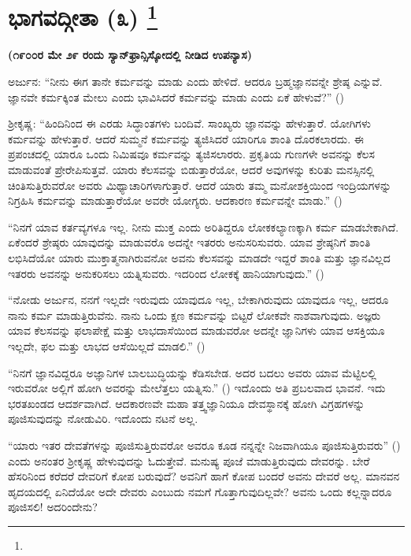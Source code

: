 
\chapter[ಭಾಗವದ್ಗೀತಾ (೩) ]{ಭಾಗವದ್ಗೀತಾ (೩) \protect\footnote{}}

\centerline{\textbf{(೧೯೦೦ರ ಮೇ ೨೯ ರಂದು ಸ್ಯಾನ್​ಫ್ರಾನ್ಸಿಸ್ಕೋದಲ್ಲಿ ನೀಡಿದ ಉಪನ್ಯಾಸ)}}

ಅರ್ಜುನ: “ನೀನು ಈಗ ತಾನೇ ಕರ್ಮವನ್ನು ಮಾಡು ಎಂದು ಹೇಳಿದೆ. ಆದರೂ ಬ್ರಹ್ಮಜ್ಞಾನವನ್ನೇ ಶ್ರೇಷ್ಠ ಎನ್ನುವೆ. ಜ್ಞಾನವೇ ಕರ್ಮಕ್ಕಿಂತ ಮೇಲು ಎಂದು ಭಾವಿಸಿದರೆ ಕರ್ಮವನ್ನು ಮಾಡು ಎಂದು ಏಕೆ ಹೇಳುವೆ?” ()

ಶ‍್ರೀಕೃಷ್ಣ: “ಹಿಂದಿನಿಂದ ಈ ಎರಡು ಸಿದ್ಧಾಂತಗಳು ಬಂದಿವೆ. ಸಾಂಖ್ಯರು ಜ್ಞಾನವನ್ನು ಹೇಳುತ್ತಾರೆ. ಯೋಗಿಗಳು ಕರ್ಮವನ್ನು ಹೇಳುತ್ತಾರೆ. ಆದರೆ ಸುಮ್ಮನೆ ಕರ್ಮವನ್ನು ತ್ಯಜಿಸಿದರೆ ಯಾರಿಗೂ ಶಾಂತಿ ದೊರಕಲಾರದು. ಈ ಪ್ರಪಂಚದಲ್ಲಿ ಯಾರೂ ಒಂದು ನಿಮಿಷವೂ ಕರ್ಮವನ್ನು ತ್ಯಜಿಸಲಾರರು. ಪ್ರಕೃತಿಯ ಗುಣಗಳೇ ಅವನನ್ನು ಕೆಲಸ ಮಾಡುವಂತೆ ಪ್ರೇರೇಪಿಸುತ್ತವೆ. ಯಾರು ಕೆಲಸವನ್ನು ಬಿಡುತ್ತಾರೆಯೋ, ಆದರೆ ಅವುಗಳನ್ನು ಕುರಿತು ಮನಸ್ಸಿನಲ್ಲಿ ಚಿಂತಿಸುತ್ತಿರುವರೋ ಅವರು ಮಿಥ್ಯಾಚಾರಿಗಳಾಗುತ್ತಾರೆ. ಆದರೆ ಯಾರು ತಮ್ಮ ಮನೋಶಕ್ತಿಯಿಂದ ಇಂದ್ರಿಯಗಳನ್ನು ನಿಗ್ರಹಿಸಿ ಕರ್ಮವನ್ನು ಮಾಡುತ್ತಾರೆಯೋ ಅವರೇ ಯೋಗ್ಯರು. ಆದಕಾರಣ ಕರ್ಮವನ್ನೇ ಮಾಡು.” ()

“ನಿನಗೆ ಯಾವ ಕರ್ತವ್ಯಗಳೂ ಇಲ್ಲ. ನೀನು ಮುಕ್ತ ಎಂದು ಅರಿತಿದ್ದರೂ ಲೋಕಕಲ್ಯಾಣಕ್ಕಾಗಿ ಕರ್ಮ ಮಾಡಬೇಕಾಗಿದೆ. ಏಕೆಂದರೆ ಶ್ರೇಷ್ಠರು ಯಾವುದನ್ನು ಮಾಡುವರೊ ಅದನ್ನೇ ಇತರರು ಅನುಸರಿಸುವರು. ಯಾವ ಶ್ರೇಷ್ಠನಿಗೆ ಶಾಂತಿ ಲಭಿಸಿದೆಯೋ ಯಾರು ಮುಕ್ತಾತ್ಮನಾಗಿರುವನೋ ಅವನು ಕೆಲಸವನ್ನು ಮಾಡದೇ ಇದ್ದರೆ ಶಾಂತಿ ಮತ್ತು ಜ್ಞಾನವಿಲ್ಲದ ಇತರರು ಅವನನ್ನು ಅನುಕರಿಸಲು ಯತ್ನಿಸುವರು. ಇದರಿಂದ ಲೋಕಕ್ಕೆ ಹಾನಿಯಾಗುವುದು.” ()

“ನೋಡು ಅರ್ಜುನ, ನನಗೆ ಇಲ್ಲದೇ ಇರುವುದು ಯಾವುದೂ ಇಲ್ಲ, ಬೇಕಾಗಿರುವುದು ಯಾವುದೂ ಇಲ್ಲ, ಆದರೂ ನಾನು ಕರ್ಮ ಮಾಡುತ್ತಿರುವೆನು. ನಾನು ಒಂದು ಕ್ಷಣ ಕರ್ಮವನ್ನು ಬಿಟ್ಟರೆ ಲೋಕವೇ ನಾಶವಾಗುವುದು. ಅಜ್ಞರು ಯಾವ ಕೆಲಸವನ್ನು ಫಲಾಪೇಕ್ಷೆ ಮತ್ತು ಲಾಭದಾಸೆಯಿಂದ ಮಾಡುವರೋ ಅದನ್ನೇ ಜ್ಞಾನಿಗಳು ಯಾವ ಆಸಕ್ತಿಯೂ ಇಲ್ಲದೇ, ಫಲ ಮತ್ತು ಲಾಭದ ಆಸೆಯಿಲ್ಲದೆ ಮಾಡಲಿ.” ()

“ನಿನಗೆ ಜ್ಞಾನವಿದ್ದರೂ ಅಜ್ಞಾನಿಗಳ ಬಾಲಬುದ್ಧಿಯನ್ನು ಕೆಡಿಸಬೇಡ. ಅದರ ಬದಲು ಅವರು ಯಾವ ಮೆಟ್ಟಿಲಲ್ಲಿ ಇರುವರೋ ಅಲ್ಲಿಗೆ ಹೋಗಿ ಅವರನ್ನು ಮೇಲೆತ್ತಲು ಯತ್ನಿಸು.” () ಇದೊಂದು ಅತಿ ಪ್ರಬಲವಾದ ಭಾವನೆ. ಇದು ಭರತಖಂಡದ ಆದರ್ಶವಾಗಿದೆ. ಆದಕಾರಣವೇ ಮಹಾ ತತ್ತ್ವಜ್ಞಾನಿಯೂ ದೇವಸ್ಥಾನಕ್ಕೆ ಹೋಗಿ ವಿಗ್ರಹಗಳನ್ನು ಪೂಜಿಸುವುದನ್ನು ನೋಡುವಿರಿ. ಇದೊಂದು ನಟನೆ ಅಲ್ಲ.

“ಯಾರು ಇತರ ದೇವತೆಗಳನ್ನು ಪೂಜಿಸುತ್ತಿರುವರೋ ಅವರೂ ಕೂಡ ನನ್ನನ್ನೇ ನಿಜವಾಗಿಯೂ ಪೂಜಿಸುತ್ತಿರುವರು” () ಎಂದು ಅನಂತರ ಶ‍್ರೀಕೃಷ್ಣ ಹೇಳುವುದನ್ನು ಓದುತ್ತೇವೆ. ಮನುಷ್ಯ ಪೂಜೆ ಮಾಡುತ್ತಿರುವುದು ದೇವರನ್ನು. ಬೇರೆ ಹೆಸರಿನಿಂದ ಕರೆದರೆ ದೇವರಿಗೆ ಕೋಪ ಬರುವುದೆ? ಅವನಿಗೆ ಹಾಗೆ ಕೋಪ ಬಂದರೆ ಅವನು ದೇವರೆ ಅಲ್ಲ. ಮಾನವನ ಹೃದಯದಲ್ಲಿ ಏನಿದೆಯೋ ಅದೇ ದೇವರು ಎಂಬುದು ನಮಗೆ ಗೊತ್ತಾಗುವುದಿಲ್ಲವೇ? ಅವನು ಒಂದು ಕಲ್ಲನ್ನಾದರೂ ಪೂಜಿಸಲಿ! ಅದರಿಂದೇನು?

